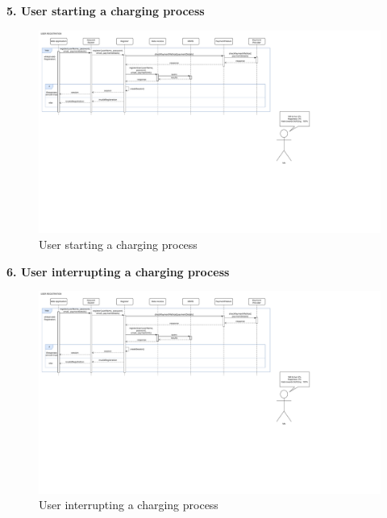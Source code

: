 \documentclass[11pt]{article}
\begin{document}
\begin{description}
    \item \textbf{5. User starting a charging process}
    \begin{figure}[!ht]
        \centering
        \includegraphics[page={5}, trim=0cm 7cm 8cm 1cmm, width=\linewidth, clip]{RuntimeDiagrams.pdf}
        \caption{User starting a charging process}
    \end{figure}
    
    \item \textbf{6. User interrupting a charging process}
    \begin{figure}[!ht]
        \centering
        \includegraphics[page={6}, trim=0cm 3cm 1cm 1cmm, width=\linewidth, clip]{RuntimeDiagrams.pdf}
        \caption{User interrupting a charging process}
    \end{figure}
    
    \newpage
    

\end{description}
\end{document}
